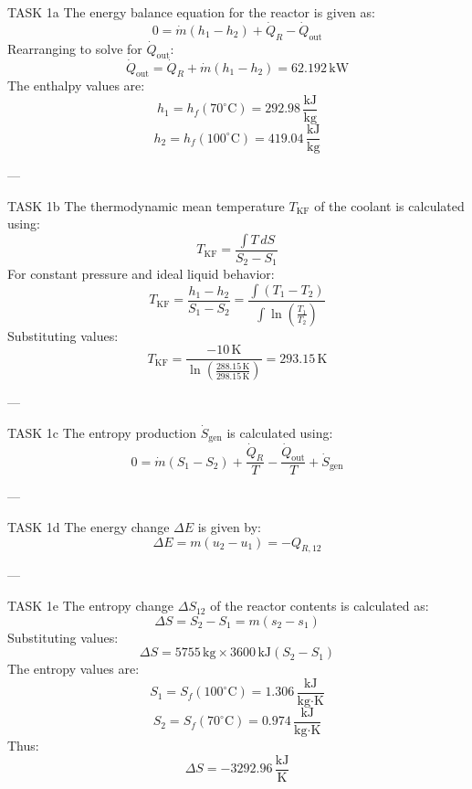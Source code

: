TASK 1a  
The energy balance equation for the reactor is given as:  
\[
0 = \dot{m} \left( h_1 - h_2 \right) + \dot{Q}_R - \dot{Q}_{\text{out}}
\]  
Rearranging to solve for \( \dot{Q}_{\text{out}} \):  
\[
\dot{Q}_{\text{out}} = \dot{Q}_R + \dot{m} \left( h_1 - h_2 \right) = 62.192 \, \text{kW}
\]  
The enthalpy values are:  
\[
h_1 = h_f \left( 70^\circ \text{C} \right) = 292.98 \, \frac{\text{kJ}}{\text{kg}}
\]  
\[
h_2 = h_f \left( 100^\circ \text{C} \right) = 419.04 \, \frac{\text{kJ}}{\text{kg}}
\]  

---

TASK 1b  
The thermodynamic mean temperature \( T_{\text{KF}} \) of the coolant is calculated using:  
\[
T_{\text{KF}} = \frac{\int T \, dS}{S_2 - S_1}
\]  
For constant pressure and ideal liquid behavior:  
\[
T_{\text{KF}} = \frac{h_1 - h_2}{S_1 - S_2} = \frac{\int \left( T_1 - T_2 \right)}{\int \ln \left( \frac{T_1}{T_2} \right)}
\]  
Substituting values:  
\[
T_{\text{KF}} = \frac{-10 \, \text{K}}{\ln \left( \frac{288.15 \, \text{K}}{298.15 \, \text{K}} \right)} = 293.15 \, \text{K}
\]  

---

TASK 1c  
The entropy production \( \dot{S}_{\text{gen}} \) is calculated using:  
\[
0 = \dot{m} \left( S_1 - S_2 \right) + \frac{\dot{Q}_R}{T} - \frac{\dot{Q}_{\text{out}}}{T} + \dot{S}_{\text{gen}}
\]  

---

TASK 1d  
The energy change \( \Delta E \) is given by:  
\[
\Delta E = m \left( u_2 - u_1 \right) = -Q_{R,12}
\]  

---

TASK 1e  
The entropy change \( \Delta S_{12} \) of the reactor contents is calculated as:  
\[
\Delta S = S_2 - S_1 = m \left( s_2 - s_1 \right)
\]  
Substituting values:  
\[
\Delta S = 5755 \, \text{kg} \times 3600 \, \text{kJ} \left( S_2 - S_1 \right)
\]  
The entropy values are:  
\[
S_1 = S_f \left( 100^\circ \text{C} \right) = 1.306 \, \frac{\text{kJ}}{\text{kg·K}}
\]  
\[
S_2 = S_f \left( 70^\circ \text{C} \right) = 0.974 \, \frac{\text{kJ}}{\text{kg·K}}
\]  
Thus:  
\[
\Delta S = -3292.96 \, \frac{\text{kJ}}{\text{K}}
\]  